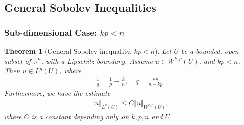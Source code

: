 \documentclass{article}
\numberwithin{equation}{section}
\newcommand{\bbR}{\mathbb{R}}
\theoremstyle{plain}
\newtheorem{theorem}{Theorem}[section]
\theoremstyle{definition}
\begin{document}
\newpage
\subsection{General Sobolev Inequalities}
\subsubsection{Sub-dimensional Case: $kp<n$}
\begin{theorem}[General Sobolev inequality, $kp<n$]\label{thm:4.11}
Let $U$ be a bounded, open subset of $\bbR^n$, with a Lipschitz boundary. Assume $u\in W^{k,p}(U)$, and $kp<n$. Then $u\in L^q(U)$, where
\begin{align*}
	\frac{1}{q}=\frac{1}{p}-\frac{k}{n},\quad q=\frac{np}{n-kp}.
\end{align*}
Furthermore, we have the estimate
\begin{align*}
	\Vert u\Vert_{L^q(U)}\leq C\Vert u\Vert_{W^{k,p}(U)},
\end{align*}
where $C$ is a constant depending only on $k,p,n$ and $U$.
\end{theorem}
\end{document}
